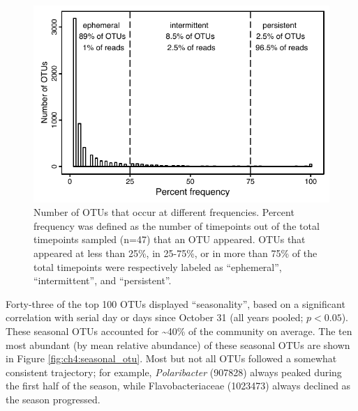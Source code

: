 \begin{figure}[ht!] 
\centering 
\includegraphics[width=1.0\textwidth]{Chapter_5_LTER/Figures/Figure_6_OTU_persistence}
\caption[Distribution of ``ephemeral'', ``intermittent'', and ``persistent'' OTUs.]{Number of OTUs that occur at different frequencies. Percent frequency was defined as the number of timepoints out of the total timepoints sampled (n=47) that an OTU appeared. OTUs that appeared at less than 25\%, in 25-75\%, or in more than 75\% of the total timepoints were respectively labeled as ``ephemeral'', ``intermittent'', and ``persistent''.} 
\label{fig:ch4:persistence} 
\end{figure}

Forty-three of the top 100 OTUs displayed ``seasonality'', based on a significant correlation with serial day or days since October 31 (all years pooled; $p < 0.05$). These seasonal OTUs accounted for \textasciitilde{}40\% of the community on average. The ten most abundant (by mean relative abundance) of these seasonal OTUs are shown in Figure \ref{fig:ch4:seasonal_otu}. Most but not all OTUs followed a somewhat consistent trajectory; for example, \emph{Polaribacter} (907828) always peaked during the first half of the season, while Flavobacteriaceae (1023473) always declined as the season progressed. 


